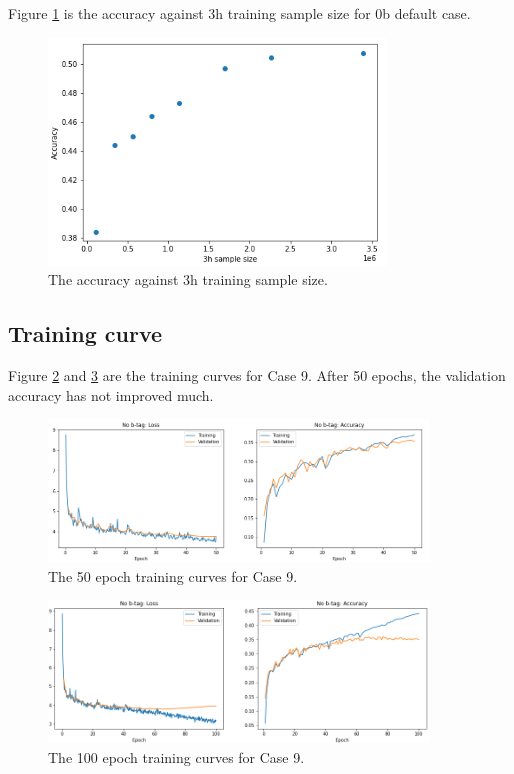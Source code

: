 \documentclass[12pt]{article}
\begin{document}
		Figure \ref{fig:accuracy_training_sample_size} is the accuracy against 3h training sample size for 0b default case. 
		\begin{figure}[htpb]
			\centering
			\includegraphics[width=0.8\textwidth]{accuracy_training_sample_size.png}
			\caption{The accuracy against 3h training sample size.}
			\label{fig:accuracy_training_sample_size}
		\end{figure}

	\subsection{Training curve}%
	\label{sub:training_curve}
		Figure \ref{fig:loss_and_accuracy_curve_no_btag_50_ep} and \ref{fig:loss_and_accuracy_curve_no_btag_100_ep} are the training curves for Case 9. After 50 epochs, the validation accuracy has not improved much.
		\begin{figure}[htpb]
			\centering
			\includegraphics[width=0.9\textwidth]{loss_and_accuracy_curve_no_btag.png}
			\caption{The 50 epoch training curves for Case 9.}
			\label{fig:loss_and_accuracy_curve_no_btag_50_ep}
		\end{figure}

		\begin{figure}[htpb]
			\centering
			\includegraphics[width=0.9\textwidth]{loss_and_accuracy_curve_no_btag_100_ep.png}
			\caption{The 100 epoch training curves for Case 9.}
			\label{fig:loss_and_accuracy_curve_no_btag_100_ep}
		\end{figure}
\end{document}
